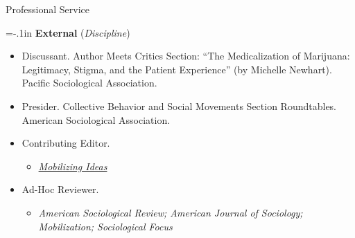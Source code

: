 \documentclass{resume} %
\newenvironment{hangt}[1]
 {\par\vspace{-\parsep}%
  \begin{itemize}[label={#1\ \quad},leftmargin=*,labelsep=0pt]
  \raggedright
  \item\relax
  \vspace*{8pt}
  }
 {\end{itemize}}
\newcommand{\datefill}{\quad \hspace{12pt}}
\begin{document}
\begin{rSection}{Professional Service}
\noindent \vspace*{-1.5em}

{\parindent=-.1in \bf External} (\textit{Discipline})

\begin{hangt}{2019 \datefill}
Discussant. Author Meets Critics Section: ``The Medicalization of Marijuana: Legitimacy, Stigma, and the Patient Experience'' (by Michelle Newhart). Pacific Sociological Association. 
\end{hangt}

\begin{hangt}{2018 \datefill}
Presider. Collective Behavior and Social Movements Section Roundtables. American Sociological Association. 
\end{hangt}


\begin{hangt}{2015--\hspace{-.15em}\datefill}
Contributing Editor.
\vspace*{-.5em} 
\begin{itemize}[leftmargin=.25in] \vspace*{-.25em} 
\item {\footnotesize \href{http://mobilizingideas.wordpress.com/burrel-vann-jr/}{\it Mobilizing Ideas}}
\end{itemize}
\end{hangt}


\begin{hangt}{2011--\hspace{-.15em}\datefill}
Ad-Hoc Reviewer.
\vspace*{-.5em} 
\begin{itemize}[leftmargin=.25in] \vspace*{-.25em} 
\item {\footnotesize \it American Sociological Review\textup{;} American Journal of Sociology\textup{;} Mobilization\textup{;} Sociological Focus}
\end{itemize}
\end{hangt}


\end{rSection}
\end{document}
